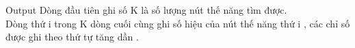 Output
Dòng đầu tiên ghi số K là số lượng nút thế năng tìm được.
\\Dòng thứ i trong K dòng cuối cùng ghi số hiệu của nút thế năng thứ i , các chỉ số được ghi theo thứ tự tăng dần .